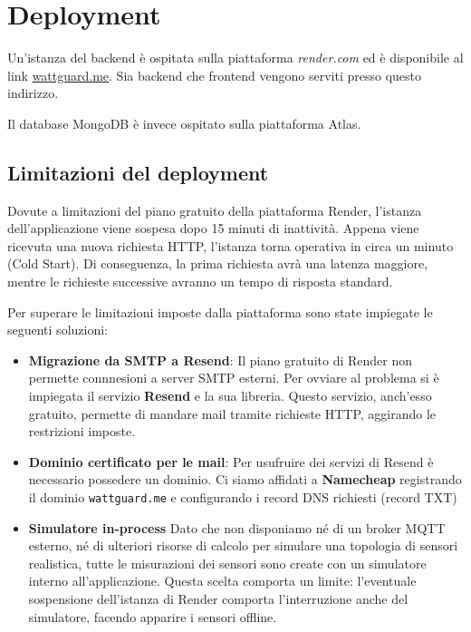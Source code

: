 \section{Deployment}
\label{chap:deployment}

Un'istanza del backend è ospitata sulla piattaforma \emph{render.com} ed è disponibile al link \newline \href{https://wattguard.me}{wattguard.me}.
Sia backend che frontend vengono serviti presso questo indirizzo.

Il database MongoDB è invece ospitato sulla piattaforma Atlas.

\subsection{Limitazioni del deployment}
Dovute a limitazioni del piano gratuito della piattaforma Render, l'istanza dell'applicazione viene sospesa dopo 15 minuti di inattività.
Appena viene ricevuta una nuova richiesta HTTP, l'istanza torna operativa in circa un minuto (Cold Start). Di conseguenza, la prima richiesta avrà una latenza maggiore, mentre le richieste successive avranno un tempo di risposta standard.

Per superare le limitazioni imposte dalla piattaforma sono state impiegate le seguenti soluzioni: 
\begin{itemize}
    \item \textbf{Migrazione da SMTP a Resend}: Il piano gratuito di Render non permette connnesioni a server SMTP esterni. Per ovviare al problema si è impiegata il servizio  \textbf{Resend} e la sua libreria. Questo servizio, anch'esso gratuito, permette di mandare mail tramite richieste HTTP, aggirando le restrizioni imposte.
    \item \textbf{Dominio certificato per le mail}: Per usufruire dei servizi di Resend è necessario possedere un dominio. Ci siamo affidati a \textbf{Namecheap} registrando il dominio \texttt{wattguard.me} e configurando i record DNS richiesti (record TXT)
    \item \textbf{Simulatore in-process} Dato che non disponiamo né di un broker MQTT esterno, né di ulteriori risorse di calcolo per simulare una topologia di sensori realistica, tutte le misurazioni dei sensori sono create con un simulatore interno all'applicazione. Questa scelta comporta un limite: l'eventuale sospensione dell'istanza di Render comporta l'interruzione anche del simulatore, facendo apparire i sensori offline. 
\end{itemize}

